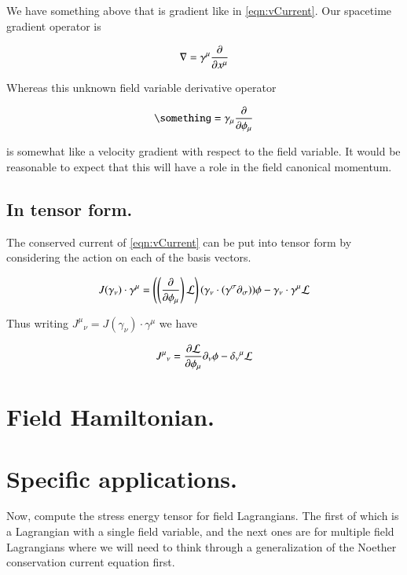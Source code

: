 \documentclass{article}
\begin{document}
We have something above that is gradient like in
\ref{eqn:vCurrent}.  Our spacetime gradient operator is

\begin{align*}
\nabla = \gamma^\mu \frac{\partial {}}{\partial {x^\mu}}
\end{align*}

Whereas this unknown field variable derivative operator

\begin{align*}
\something = \gamma_\mu \PD{\phi_\mu}{}
\end{align*}

is somewhat like a velocity gradient with respect to the field variable.  It would be reasonable to expect that this will have a role in the field canonical momentum.

\subsection{ In tensor form. }

The conserved current 
of \ref{eqn:vCurrent}
can be put into tensor form by considering the action on
each of the basis vectors.

\begin{align*}
J(\gamma_\nu) \cdot \gamma^\mu 
&= 
\left( \left(\frac{\partial {}}{\partial {\phi_\mu}} \right) \mathcal{L} \right)
(\gamma_\nu \cdot (\gamma^\sigma \partial_\sigma)) \phi 
- \gamma_\nu \cdot \gamma^\mu \mathcal{L}  \\
\end{align*}

Thus writing ${J^\mu}_\nu = J(\gamma_\nu) \cdot \gamma^\mu$ we have

\begin{align}
{J^\mu}_\nu = \frac{\partial {\mathcal{L}}}{\partial {\phi_\mu}} \partial_\nu \phi - {\delta_\nu}^\mu \mathcal{L}  
\end{align}

\section{ Field Hamiltonian. }

\section{ Specific applications. }

Now, compute the stress energy tensor for field Lagrangians.  The first of which is a 
Lagrangian with a single field variable, and the next ones are for multiple field Lagrangians where
we will need to think through a generalization of the Noether conservation current equation first.
\end{document}
